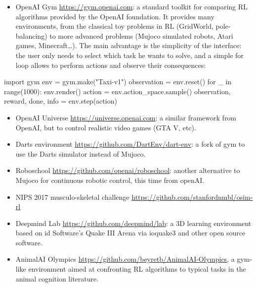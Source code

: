 \documentclass[
  letterpaper,
  DIV=11,
  numbers=noendperiod]{scrreprt}
\newenvironment{Shaded}{\begin{snugshade}}{\end{snugshade}}
\newcommand{\BuiltInTok}[1]{\textcolor[rgb]{0.00,0.23,0.31}{#1}}
\newcommand{\ControlFlowTok}[1]{\textcolor[rgb]{0.00,0.23,0.31}{#1}}
\newcommand{\DecValTok}[1]{\textcolor[rgb]{0.68,0.00,0.00}{#1}}
\newcommand{\ImportTok}[1]{\textcolor[rgb]{0.00,0.46,0.62}{#1}}
\newcommand{\KeywordTok}[1]{\textcolor[rgb]{0.00,0.23,0.31}{#1}}
\newcommand{\NormalTok}[1]{\textcolor[rgb]{0.00,0.23,0.31}{#1}}
\newcommand{\OperatorTok}[1]{\textcolor[rgb]{0.37,0.37,0.37}{#1}}
\newcommand{\StringTok}[1]{\textcolor[rgb]{0.13,0.47,0.30}{#1}}
\providecommand{\tightlist}{%
  \setlength{\itemsep}{0pt}\setlength{\parskip}{0pt}}\usepackage{longtable,booktabs,array}
\begin{document}
\begin{itemize}
\tightlist
\item
  OpenAI Gym \url{https://gym.openai.com}: a standard toolkit for
  comparing RL algorithms provided by the OpenAI foundation. It provides
  many environments, from the classical toy problems in RL (GridWorld,
  pole-balancing) to more advanced problems (Mujoco simulated robots,
  Atari games, Minecraft\ldots). The main advantage is the simplicity of
  the interface: the user only needs to select which task he wants to
  solve, and a simple for loop allows to perform actions and observe
  their consequences:
\end{itemize}

\begin{Shaded}
\begin{Highlighting}[]
\ImportTok{import}\NormalTok{ gym}
\NormalTok{env }\OperatorTok{=}\NormalTok{ gym.make(}\StringTok{"Taxi{-}v1"}\NormalTok{)}
\NormalTok{observation }\OperatorTok{=}\NormalTok{ env.reset()}
\ControlFlowTok{for}\NormalTok{ \_ }\KeywordTok{in} \BuiltInTok{range}\NormalTok{(}\DecValTok{1000}\NormalTok{):}
\NormalTok{    env.render()}
\NormalTok{    action }\OperatorTok{=}\NormalTok{ env.action\_space.sample()}
\NormalTok{    observation, reward, done, info }\OperatorTok{=}\NormalTok{ env.step(action)}
\end{Highlighting}
\end{Shaded}

\begin{itemize}
\item
  OpenAI Universe \url{https://universe.openai.com}: a similar framework
  from OpenAI, but to control realistic video games (GTA V, etc).
\item
  Darts environment \url{https://github.com/DartEnv/dart-env}: a fork of
  gym to use the Darts simulator instead of Mujoco.
\item
  Roboschool \url{https://github.com/openai/roboschool}: another
  alternative to Mujoco for continuous robotic control, this time from
  openAI.
\item
  NIPS 2017 musculo-skeletal challenge
  \url{https://github.com/stanfordnmbl/osim-rl}
\item
  Deepmind Lab \url{https://github.com/deepmind/lab}: a 3D learning
  environment based on id Software's Quake III Arena via ioquake3 and
  other open source software.
\item
  AnimalAI Olympics \url{https://github.com/beyretb/AnimalAI-Olympics},
  a gym-like environment aimed at confronting RL algorithms to typical
  tasks in the animal cognition literature.
\end{itemize}
\end{document}
